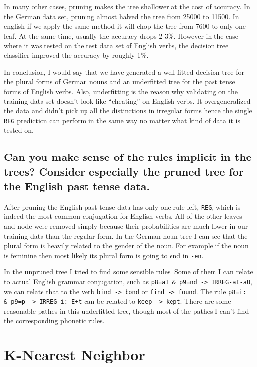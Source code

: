\documentclass[11pt]{article} %
\begin{document}
In many other cases, pruning makes the tree shallower at the cost of accuracy. In the German data set, pruning almost halved the tree from 25000 to 11500. In english if we apply the same method it will chop the tree from 7600 to only one leaf. At the same time, usually the accuracy drops 2-3\%. However in the case where it was tested on the test data set of English verbs, the decision tree classifier improved the accuracy by roughly 1\%.

In conclusion, I would say that we have generated a well-fitted decision tree for the plural forms of German nouns and an underfitted tree for the past tense forms of English verbs. Also, underfitting is the reason why validating on the training data set doesn't look like ``cheating'' on English verbs. It overgeneralized the data and didn't pick up all the distinctions in irregular forms hence the single \verb|REG| prediction can perform in the same way no matter what kind of data it is tested on.

\subsection{Can you make sense of the rules implicit in the trees? Consider especially the pruned tree for the English past tense data.}

After pruning the English past tense data has only one rule left, \verb|REG|, which is indeed the most common conjugation for English verbs. All of the other leaves and node were removed simply because their probabilities are much lower in our training data than the regular form. In the German noun tree I can see that the plural form is heavily related to the gender of the noun. For example if the noun is feminine then most likely its plural form is going to end in \verb|-en|.

In the unpruned tree I tried to find some sensible rules. Some of them I can relate to actual English grammar conjugation, such as \texttt{p8=aI \& p9=nd -> IRREG-aI-aU}, we can relate that to the verb \texttt{bind -> bond} or \texttt{find -> found}. The rule \texttt{p8=i: \& p9=p -> IRREG-i:-E+t} can be related to \texttt{keep -> kept}. There are some reasonable pathes in this underfitted tree, though most of the pathes I can't find the corresponding phonetic rules.

\section{K-Nearest Neighbor}
\end{document}
